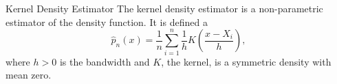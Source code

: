 \documentclass[avery5371,grid]{flashcards}
\begin{document}
\begin{flashcard}[Definition]{Kernel Density Estimator}
The kernel density estimator is a non-parametric estimator of the density function. It is defined a
\[
\hat p_n(x) = \frac{1}{n} \sum_{i=1}^n \frac{1}{h} K\left( \frac{x-X_i}{h}\right),
\]
where $h>0$ is the bandwidth and $K$, the kernel, is a symmetric density with mean zero.
\end{flashcard}
\end{document}
